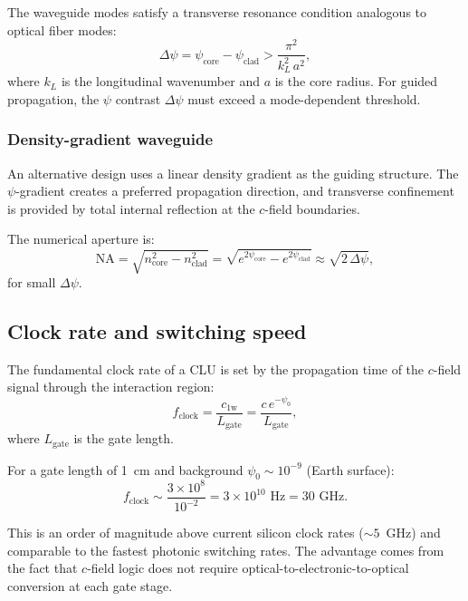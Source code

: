 \documentclass[aps,prd,twocolumn,superscriptaddress,nofootinbib,floatfix]{revtex4-2}
\newcommand{\psifield}{\psi}
\newcommand{\cfield}{c_{\text{1w}}}
\newcommand{\cvac}{c}
\newcommand{\ee}[1]{\times 10^{#1}}
\begin{document}
The waveguide modes satisfy a transverse resonance condition
analogous to optical fiber modes:
\begin{equation}
\Delta\psifield = \psifield_{\text{core}} - \psifield_{\text{clad}}
> \frac{\pi^2}{k_L^2\,a^2},
\label{eq:waveguide_condition}
\end{equation}
where $k_L$ is the longitudinal wavenumber and $a$ is the core
radius. For guided propagation, the $\psifield$ contrast
$\Delta\psifield$ must exceed a mode-dependent threshold.

\subsubsection{Density-gradient waveguide}

An alternative design uses a linear density gradient as the
guiding structure. The $\psifield$-gradient creates a preferred
propagation direction, and transverse confinement is provided by
total internal reflection at the $c$-field boundaries.

The numerical aperture is:
\begin{equation}
\text{NA} = \sqrt{n_{\text{core}}^2 - n_{\text{clad}}^2}
= \sqrt{e^{2\psifield_{\text{core}}} - e^{2\psifield_{\text{clad}}}}
\approx \sqrt{2\,\Delta\psifield},
\label{eq:NA}
\end{equation}
for small $\Delta\psifield$.

\subsection{Clock rate and switching speed}

The fundamental clock rate of a CLU is set by the propagation time
of the $c$-field signal through the interaction region:
\begin{equation}
f_{\text{clock}} = \frac{\cfield}{L_{\text{gate}}}
= \frac{\cvac\,e^{-\psifield_0}}{L_{\text{gate}}},
\label{eq:clock_rate}
\end{equation}
where $L_{\text{gate}}$ is the gate length.

For a gate length of 1~cm and background $\psifield_0 \sim 10^{-9}$
(Earth surface):
\begin{equation}
f_{\text{clock}} \sim \frac{3\ee{8}}{10^{-2}}
= 3\ee{10}\text{ Hz} = 30\text{ GHz}.
\label{eq:clock_numerical}
\end{equation}

This is an order of magnitude above current silicon clock rates
($\sim 5$~GHz) and comparable to the fastest photonic switching
rates. The advantage comes from the fact that $c$-field logic
does not require optical-to-electronic-to-optical conversion at
each gate stage.
\end{document}

